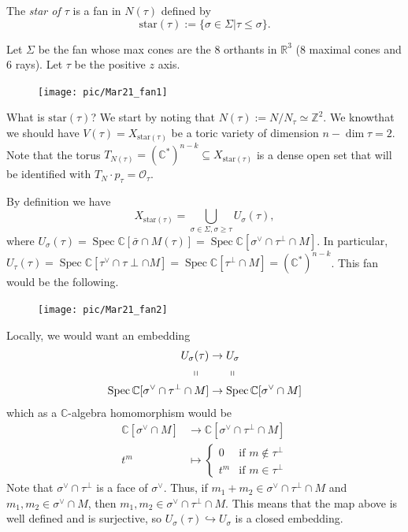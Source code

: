 \documentclass[a4paper,12pt]{amsart}
\newcommand{\ZZ}{\mathbb{Z}}
\newcommand{\RR}{\mathbb{R}}
\newcommand{\CC}{\mathbb{C}}
\newcommand{\OO}{\ensuremath{\mathcal{O}}}
\DeclareMathOperator{\Spec}{Spec}
\begin{document}
\begin{definition}
	The \textit{star of $\tau$} is a fan in $N(\tau)$ defined by
	$$\text{star}(\tau):=\{\sigma\in\Sigma|\tau\leq\sigma\}.$$
\end{definition}

\begin{example}
	Let $\Sigma$ be the fan whose max cones are the 8 orthants in $\RR^3$ (8 maximal cones and 6 rays). Let $\tau$ be the positive $z$ axis.
	
	\begin{figure}[h]
		\centering
		\texttt{[image: pic/Mar21\_fan1]}
	\end{figure}
	
	What is $\text{star}(\tau)$? We start by noting that $N(\tau):=N/N_\tau\simeq\ZZ^2$. We knowthat we should have $V(\tau)=X_{\text{star}(\tau)}$ be a toric variety of dimension $n-\dim\tau=2$. Note that the torus $T_{N(\tau)}=(\CC^*)^{n-k}\subseteq X_{\text{star}(\tau)}$ is a dense open set that will be identified with $T_N\cdot p_\tau=\OO_\tau$. 
	
	By definition we have
	$$X_{\text{star}(\tau)}=\bigcup_{\sigma\in\Sigma,\sigma\geq\tau}U_\sigma(\tau),$$
	where $U_\sigma(\tau)=\Spec\CC[\bar{\sigma}\cap M(\tau)]=\Spec\CC[\sigma^\vee\cap\tau^\perp\cap M]$. In particular, $U_\tau(\tau)=\Spec\CC[\tau^\vee\cap\tau\perp\cap M]=\Spec\CC[\tau^\perp\cap M]=(\CC^*)^{n-k}$. This fan would be the following.
	
	\begin{figure}[h]
		\centering
		\texttt{[image: pic/Mar21\_fan2]}
	\end{figure}
	
	Locally, we would want an embedding
	\begin{align*}
	U_\sigma(\tau)&\rightarrow U_\sigma\\
	\shortparallel\ \ \ &\quad\ \ \shortparallel\\
	\Spec\CC[\sigma^\vee\cap\tau^\perp\cap M]&\rightarrow\Spec\CC[\sigma^\vee\cap M]
	\end{align*}
	which as a $\CC$-algebra homomorphism would be
	\begin{align*}
	\CC[\sigma^\vee\cap M]&\rightarrow\CC[\sigma^\vee\cap\tau^\perp\cap M]\\
	t^m&\mapsto\begin{cases}
	0&\text{if }m\not\in\tau^\perp\\
	t^m&\text{if }m\in\tau^\perp
	\end{cases}
	\end{align*}
	Note that $\sigma^\vee\cap\tau^\perp$ is a face of $\sigma^\vee$. Thus, if $m_1+m_2\in\sigma^\vee\cap\tau^\perp\cap M$ and $m_1,m_2\in\sigma^\vee\cap M$, then $m_1,m_2\in\sigma^\vee\cap\tau^\perp\cap M$. This means that the map above is well defined and is surjective, so $U_\sigma(\tau)\hookrightarrow U_\sigma$ is a closed embedding.
\end{example}
\end{document}
